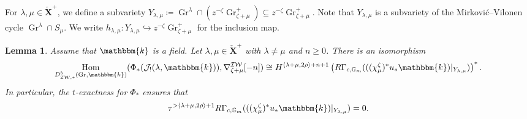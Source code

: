 \documentclass{amsart}
\newcommand{\G}{\mathbb{G}}
\renewcommand{\k}{\mathbbm{k}}
\newcommand{\scrJ}{\mathcal{J}}
\newcommand{\bfXv}{\check{\mathbf{X}}}
\newcommand{\IW}{\mathcal{IW}}
\DeclareMathOperator{\Hom}{Hom}
\DeclareMathOperator{\Gr}{Gr}
\newtheorem{lemma}[subsubsection]{Lemma}
\theoremstyle{definition}
\begin{document}
    For $\lambda, \mu \in \bfXv^{+}$, we define a subvariety $Y_{\lambda, \mu} \coloneq \Gr^{\lambda} \cap (z^{-\zeta} \Gr_{\zeta + \mu}^+) \subseteq z^{-\zeta} \Gr_{\zeta + \mu}^+$.
    Note that $Y_{\lambda, \mu}$ is a subvariety of the Mirković--Vilonen cycle $\Gr^{\lambda} \cap S_{\mu}$. We write $h_{\lambda, \mu} : Y_{\lambda,\mu} \hookrightarrow z^{-\zeta} \Gr_{\zeta + \mu}^+$ for the inclusion map.

    \begin{lemma}\label{lem:hom_and_cohomology_std_costd}
        Assume that $\k$ is a field. Let $\lambda, \mu \in \bfXv^+$ with $\lambda \neq \mu$ and $n \geq 0$.
        There is an isomorphism
        \[\Hom_{D_{\IW, *}^b (\Gr, \k)} (\Phi_* (\scrJ_! (\lambda, \k)), \nabla_{\zeta + \mu}^{\IW} [-n]) \cong H^{\langle \lambda + \mu, 2\rho \rangle + n + 1} \left( R\Gamma_{c, \G_m} (((\chi_{\mu}^{\zeta})^* u_* \k)\vert_{Y_{\lambda, \mu}} )\right)^*.\]
        In particular, the $t$-exactness for $\Phi_*$ ensures that
        \[\tau^{> \langle \lambda + \mu, 2\rho \rangle + 1} R\Gamma_{c, \G_m} (((\chi_{\mu}^{\zeta})^* u_* \k)\vert_{Y_{\lambda, \mu}}) = 0.\]
    \end{lemma}
\end{document}
